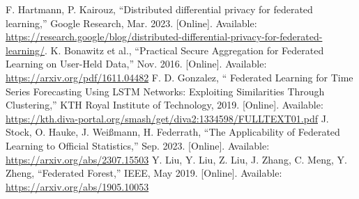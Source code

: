 \documentclass[conference]{IEEEtran}
\begin{document}
\begin{thebibliography}{00}
     F. Hartmann, P. Kairouz, ``Distributed differential privacy for federated learning,'' Google Research, Mar. 2023. [Online]. Available: \url{https://research.google/blog/distributed-differential-privacy-for-federated-learning/}.
     K. Bonawitz et al., ``Practical Secure Aggregation for Federated Learning on User-Held Data,'' Nov. 2016. [Online]. Available: \url{https://arxiv.org/pdf/1611.04482}
     F. D. Gonzalez, `` Federated Learning for Time Series Forecasting Using LSTM Networks: Exploiting Similarities Through Clustering,'' KTH Royal Institute of Technology, 2019. [Online]. Available: \url{https://kth.diva-portal.org/smash/get/diva2:1334598/FULLTEXT01.pdf}
     J. Stock, O. Hauke, J. Weißmann, H. Federrath, ``The Applicability of Federated Learning to Official Statistics,'' Sep. 2023. [Online]. Available: \url{https://arxiv.org/abs/2307.15503}
     Y. Liu, Y. Liu, Z. Liu, J. Zhang, C. Meng, Y. Zheng, ``Federated Forest,'' IEEE, May 2019. [Online]. Available: \url{https://arxiv.org/abs/1905.10053}

\end{thebibliography}
\end{document}
